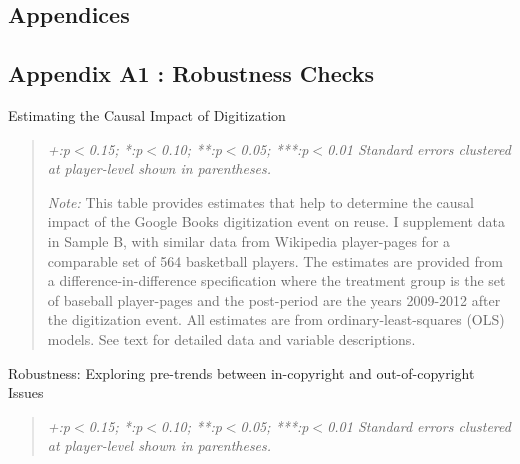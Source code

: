 \begin{center}
\begin{table}[!htbp]
\section{Appendices}

\subsection{Appendix A1 : Robustness Checks}
\label{sec:envelope}


\caption{Estimating the Causal Impact of Digitization}
\vspace{5mm}

\begin{quote}
\vspace{5mm}

\emph{+:p$<$0.15; *:p$<$0.10; **:p$<$0.05; ***:p$<$0.01 
\newline
Standard errors clustered at player-level shown in parentheses.}

\vspace{5mm}

\emph{Note:} This table provides estimates that help to determine the causal impact of the Google Books digitization event on reuse. I supplement data in Sample B, with similar data from Wikipedia player-pages for a comparable set of 564 basketball players. The estimates are provided from a difference-in-difference specification where the treatment group is the set of baseball player-pages and the post-period are the years 2009-2012 after the digitization event. All estimates are from ordinary-least-squares (OLS) models. See text for detailed data and variable descriptions.
\end{quote}
\label{tab:basketball}
\end{table}
\end{center}



\begin{center}
\begin{table}[!htbp]

\caption{Robustness: Exploring pre-trends between in-copyright and out-of-copyright Issues}
{\small

}
\begin{quote}
\vspace{5mm}

\emph{+:p$<$0.15; *:p$<$0.10; **:p$<$0.05; ***:p$<$0.01 
\newline
Standard errors clustered at player-level shown in parentheses.}

\vspace{5mm}

\end{quote}
\label{tab:leads_lags}
\end{table}
\end{center}

